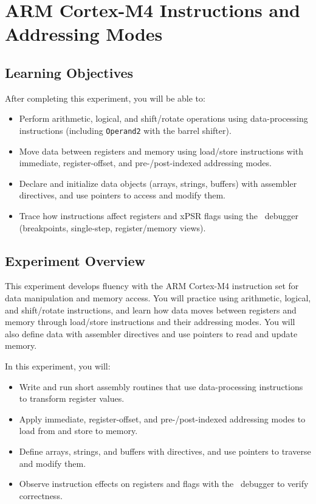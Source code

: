 \chapter{ARM Cortex-M4 Instructions and Addressing Modes}
\section*{Learning Objectives}
After completing this experiment, you will be able to:
\begin{itemize}[nosep]
  \item Perform arithmetic, logical, and shift/rotate operations using data-processing instructions (including \texttt{Operand2} with the barrel shifter).
  \item Move data between registers and memory using load/store instructions with immediate, register-offset, and pre-/post-indexed addressing modes.
  \item Declare and initialize data objects (arrays, strings, buffers) with assembler directives, and use pointers to access and modify them.
  \item Trace how instructions affect registers and xPSR flags using the \keil\ debugger (breakpoints, single-step, register/memory views).
\end{itemize}
\section*{Experiment Overview}
This experiment develops fluency with the ARM Cortex-M4 instruction set for data manipulation and memory access. 
You will practice using arithmetic, logical, and shift/rotate instructions, and learn how data moves between registers and memory through load/store instructions and their addressing modes. 
You will also define data with assembler directives and use pointers to read and update memory.

\noindent In this experiment, you will:
\begin{itemize}[nosep]
  \item Write and run short assembly routines that use data-processing instructions to transform register values.
  \item Apply immediate, register-offset, and pre-/post-indexed addressing modes to load from and store to memory.
  \item Define arrays, strings, and buffers with directives, and use pointers to traverse and modify them.
  \item Observe instruction effects on registers and flags with the \keil\ debugger to verify correctness.
\end{itemize}

